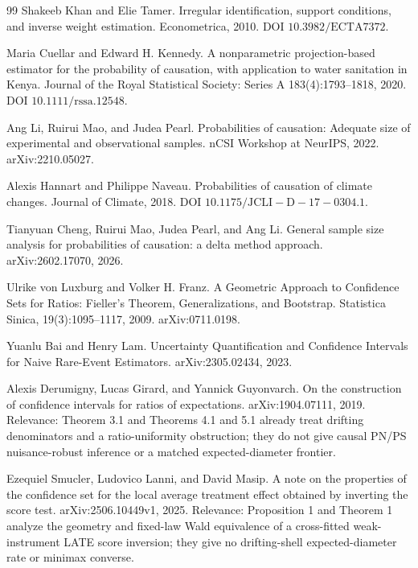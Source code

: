 \documentclass{article}
\begin{document}
\begin{thebibliography}{99}
   Shakeeb Khan and Elie Tamer. Irregular identification, support conditions, and inverse weight estimation. Econometrica, 2010. DOI \(10.3982/\mathrm{ECTA7372}\).

   Maria Cuellar and Edward H. Kennedy. A nonparametric projection-based estimator for the probability of causation, with application to water sanitation in Kenya. Journal of the Royal Statistical Society: Series A 183(4):1793--1818, 2020. DOI \(10.1111/\mathrm{rssa}.12548\).

   Ang Li, Ruirui Mao, and Judea Pearl. Probabilities of causation: Adequate size of experimental and observational samples. nCSI Workshop at NeurIPS, 2022. arXiv:2210.05027.

   Alexis Hannart and Philippe Naveau. Probabilities of causation of climate changes. Journal of Climate, 2018. DOI \(10.1175/\mathrm{JCLI-D-17-0304.1}\).

   Tianyuan Cheng, Ruirui Mao, Judea Pearl, and Ang Li. General sample size analysis for probabilities of causation: a delta method approach. arXiv:2602.17070, 2026.

   Ulrike von Luxburg and Volker H. Franz. A Geometric Approach to Confidence Sets for Ratios: Fieller's Theorem, Generalizations, and Bootstrap. Statistica Sinica, 19(3):1095--1117, 2009. arXiv:0711.0198.

   Yuanlu Bai and Henry Lam. Uncertainty Quantification and Confidence Intervals for Naive Rare-Event Estimators. arXiv:2305.02434, 2023.

   Alexis Derumigny, Lucas Girard, and Yannick Guyonvarch. On the construction of confidence intervals for ratios of expectations. arXiv:1904.07111, 2019. Relevance: Theorem 3.1 and Theorems 4.1 and 5.1 already treat drifting denominators and a ratio-uniformity obstruction; they do not give causal PN/PS nuisance-robust inference or a matched expected-diameter frontier.

   Ezequiel Smucler, Ludovico Lanni, and David Masip. A note on the properties of the confidence set for the local average treatment effect obtained by inverting the score test. arXiv:2506.10449v1, 2025. Relevance: Proposition 1 and Theorem 1 analyze the geometry and fixed-law Wald equivalence of a cross-fitted weak-instrument LATE score inversion; they give no drifting-shell expected-diameter rate or minimax converse.


\end{thebibliography}
\end{document}
